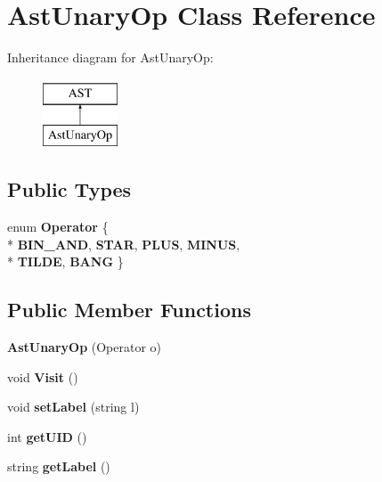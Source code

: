 \hypertarget{classAstUnaryOp}{\section{Ast\-Unary\-Op Class Reference}
\label{classAstUnaryOp}
}
Inheritance diagram for Ast\-Unary\-Op\-:\begin{figure}[H]
\begin{center}
\leavevmode
\includegraphics[height=2.000000cm]{classAstUnaryOp}
\end{center}
\end{figure}
\subsection*{Public Types}
\begin{DoxyCompactItemize}
\item 
enum {\bfseries Operator} \{ \\*
{\bfseries B\-I\-N\-\_\-\-A\-N\-D}, 
{\bfseries S\-T\-A\-R}, 
{\bfseries P\-L\-U\-S}, 
{\bfseries M\-I\-N\-U\-S}, 
\\*
{\bfseries T\-I\-L\-D\-E}, 
{\bfseries B\-A\-N\-G}
 \}
\end{DoxyCompactItemize}
\subsection*{Public Member Functions}
\begin{DoxyCompactItemize}
\item 
\hypertarget{classAstUnaryOp_aa363b2df2fbb4653a683899e59df2080}{{\bfseries Ast\-Unary\-Op} (Operator o)}\label{classAstUnaryOp_aa363b2df2fbb4653a683899e59df2080}

\item 
\hypertarget{classAstUnaryOp_a23e13d42f33d5882d58ca48e8053f1a0}{void {\bfseries Visit} ()}\label{classAstUnaryOp_a23e13d42f33d5882d58ca48e8053f1a0}

\item 
\hypertarget{classAST_a71d680856e95ff89f55d5311a552eba6}{void {\bfseries set\-Label} (string l)}\label{classAST_a71d680856e95ff89f55d5311a552eba6}

\item 
\hypertarget{classAST_ab7a5b1d9f1c2de0d98deb356f724a42c}{int {\bfseries get\-U\-I\-D} ()}\label{classAST_ab7a5b1d9f1c2de0d98deb356f724a42c}

\item 
\hypertarget{classAST_aee029be902fffc927d16ccb03eb922ad}{string {\bfseries get\-Label} ()}\label{classAST_aee029be902fffc927d16ccb03eb922ad}

\end{DoxyCompactItemize}
